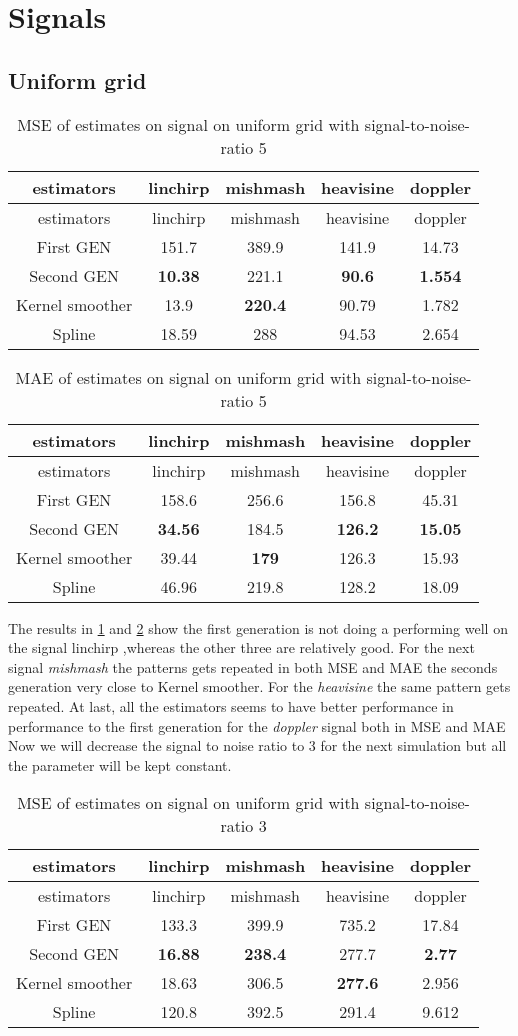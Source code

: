 \documentclass[12pt,twoside, a4paper]{reedthesis}
\begin{document}
\hypertarget{signals}{%
\section{Signals}\label{signals}}

\hypertarget{uniform-grid}{%
\subsection{Uniform grid}\label{uniform-grid}}
\begin{longtable}[]{@{}ccccc@{}}
\caption{\label{tbl:mseunif5} MSE of estimates on signal on uniform grid with signal-to-noise-ratio 5}\tabularnewline
\toprule
estimators & linchirp & mishmash & heavisine & doppler\tabularnewline
\midrule
\endfirsthead
\toprule
estimators & linchirp & mishmash & heavisine & doppler\tabularnewline
\midrule
\endhead
First GEN & 151.7 & 389.9 & 141.9 & 14.73\tabularnewline
Second GEN & \textbf{10.38} & 221.1 & \textbf{90.6} & \textbf{1.554}\tabularnewline
Kernel smoother & 13.9 & \textbf{220.4} & 90.79 & 1.782\tabularnewline
Spline & 18.59 & 288 & 94.53 & 2.654\tabularnewline
\bottomrule
\end{longtable}
\begin{longtable}[]{@{}ccccc@{}}
\caption{\label{tbl:maeunif5}MAE of estimates on signal on uniform grid with signal-to-noise-ratio 5}\tabularnewline
\toprule
estimators & linchirp & mishmash & heavisine & doppler\tabularnewline
\midrule
\endfirsthead
\toprule
estimators & linchirp & mishmash & heavisine & doppler\tabularnewline
\midrule
\endhead
First GEN & 158.6 & 256.6 & 156.8 & 45.31\tabularnewline
Second GEN & \textbf{34.56} & 184.5 & \textbf{126.2} & \textbf{15.05}\tabularnewline
Kernel smoother & 39.44 & \textbf{179} & 126.3 & 15.93\tabularnewline
Spline & 46.96 & 219.8 & 128.2 & 18.09\tabularnewline
\bottomrule
\end{longtable}
The results in \ref{tbl:mseunif5} and \ref{tbl:maeunif5} show the first generation is not doing a performing well on the signal linchirp ,whereas the other three are relatively good. For the next signal \emph{mishmash} the patterns gets repeated in both MSE and MAE the seconds generation very close to Kernel smoother. For the \emph{heavisine} the same pattern gets repeated. At last, all the estimators seems to have better performance in performance to the first generation for the \emph{doppler} signal both in MSE and MAE
Now we will decrease the signal to noise ratio to 3 for the next simulation but all the parameter will be kept constant.
\begin{longtable}[]{@{}ccccc@{}}
\caption{\label{tbl:mseunif3} MSE of estimates on signal on uniform grid with signal-to-noise-ratio 3}\tabularnewline
\toprule
estimators & linchirp & mishmash & heavisine & doppler\tabularnewline
\midrule
\endfirsthead
\toprule
estimators & linchirp & mishmash & heavisine & doppler\tabularnewline
\midrule
\endhead
First GEN & 133.3 & 399.9 & 735.2 & 17.84\tabularnewline
Second GEN & \textbf{16.88} & \textbf{238.4} & 277.7 & \textbf{2.77}\tabularnewline
Kernel smoother & 18.63 & 306.5 & \textbf{277.6} & 2.956\tabularnewline
Spline & 120.8 & 392.5 & 291.4 & 9.612\tabularnewline
\bottomrule
\end{longtable}
\end{document}
